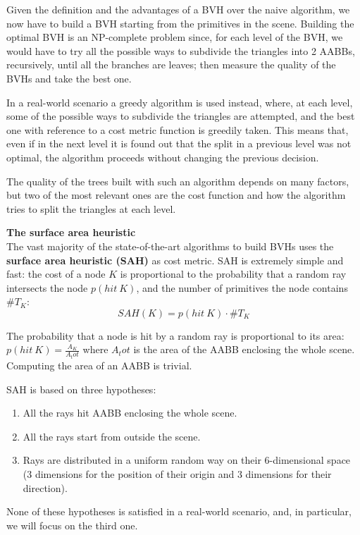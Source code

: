 \documentclass{PoliMi_MasterThesis}
\begin{document}
Given the definition and the advantages of a BVH over the naive algorithm, we now have to build a BVH starting from the primitives in the scene.
Building the optimal BVH is an NP-complete problem since, for each level of the BVH, we would have to try all the possible ways to subdivide the triangles into 2 AABBs, recursively, until all the branches are leaves; then measure the quality of the BVHs and take the best one.

In a real-world scenario a greedy algorithm is used instead, where, at each level, some of the possible ways to subdivide the triangles are attempted, and the best one with reference to a cost metric function is greedily taken. This means that, even if in the next level it is found out that the split in a previous level was not optimal, the algorithm proceeds without changing the previous decision.

The quality of the trees built with such an algorithm depends on many factors, but two of the most relevant ones are the cost function and how the algorithm tries to split the triangles at each level.

\large \textbf{The surface area heuristic} \normalsize\\
The vast majority of the state-of-the-art algorithms to build BVHs uses the \textbf{surface area heuristic (SAH)} as cost metric. SAH is extremely simple and fast: the cost of a node $K$ is proportional to the probability that a random ray intersects the node $p(hit\:K)$, and the number of primitives the node contains $\#T_K$:
$$SAH(K) = p(hit\:K) \cdot \#T_K$$

The probability that a node is hit by a random ray is proportional to its area: $p(hit\:K) = \frac{A_K}{A_tot}$ where $A_tot$ is the area of the AABB enclosing the whole scene.
Computing the area of an AABB is trivial.

SAH is based on three hypotheses:
\begin{enumerate}
	\item All the rays hit AABB enclosing the whole scene.
	\item All the rays start from outside the scene.
	\item Rays are distributed in a uniform random way on their 6-dimensional space (3 dimensions for the position of their origin and 3 dimensions for their direction).
\end{enumerate}

None of these hypotheses is satisfied in a real-world scenario, and, in particular, we will focus on the third one.
\end{document}
